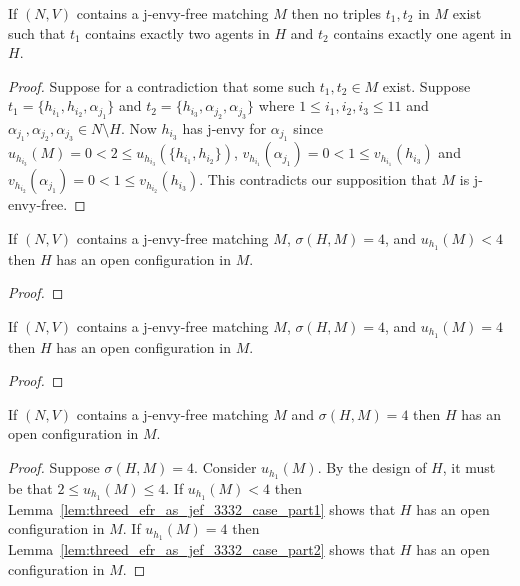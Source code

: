 \begin{lem}
\label{lem:threed_efr_as_jef_two_and_one_in_h}
If $(N, V)$ contains a j-envy-free matching $M$ then no triples $t_1, t_2$ in $M$ exist such that $t_1$ contains exactly two agents in $H$ and $t_2$ contains exactly one agent in $H$.
\end{lem}
\begin{proof}
Suppose for a contradiction that some such $t_1, t_2 \in M$ exist. Suppose $t_1 = \{ h_{i_1}, h_{i_2}, \alpha_{j_1} \}$ and $t_2 = \{ h_{i_3}, \alpha_{j_2}, \alpha_{j_3} \}$ where $1\leq i_1, i_2, i_3 \leq 11$ and $\alpha_{j_1}, \alpha_{j_2}, \alpha_{j_3} \in N \setminus H$. Now $h_{i_3}$ has j-envy for $\alpha_{j_1}$ since $u_{h_{i_3}}(M) = 0 < 2 \leq u_{h_{i_3}}(\{ h_{i_1}, h_{i_2} \})$, $v_{h_{i_1}}(\alpha_{j_1}) = 0 < 1 \leq v_{h_{i_1}}(h_{i_3})$ and $v_{h_{i_2}}(\alpha_{j_1}) = 0 < 1 \leq v_{h_{i_2}}(h_{i_3})$. This contradicts our supposition that $M$ is j-envy-free.
\end{proof}


\begin{lem}
\label{lem:threed_efr_as_jef_3332_case_part1}
If $(N, V)$ contains a j-envy-free matching $M$, $\sigma(H, M) = 4$, and $u_{h_1}(M) < 4$ then $H$ has an open configuration in $M$.
\end{lem}
\begin{proof}

\end{proof}

\begin{lem}
\label{lem:threed_efr_as_jef_3332_case_part2}
If $(N, V)$ contains a j-envy-free matching $M$, $\sigma(H, M) = 4$, and $u_{h_1}(M) = 4$ then $H$ has an open configuration in $M$.
\end{lem}
\begin{proof}

\end{proof}

\begin{lem}
\label{lem:threed_efr_as_jef_3332_case}
If $(N, V)$ contains a j-envy-free matching $M$ and $\sigma(H, M) = 4$ then $H$ has an open configuration in $M$.
\end{lem}
\begin{proof}
Suppose $\sigma(H, M) = 4$. Consider $u_{h_1}(M)$. By the design of $H$, it must be that $2 \leq u_{h_1}(M) \leq 4$. If $u_{h_1}(M) < 4$ then Lemma~\ref{lem:threed_efr_as_jef_3332_case_part1} shows that $H$ has an open configuration in $M$. If $u_{h_1}(M) = 4$ then Lemma~\ref{lem:threed_efr_as_jef_3332_case_part2} shows that $H$ has an open configuration in $M$.
\end{proof}

